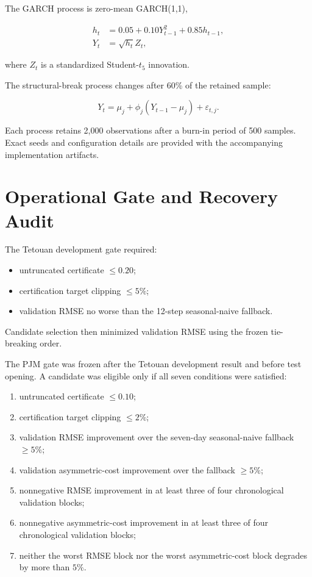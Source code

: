 \documentclass[12pt,draftclsnofoot,onecolumn]{IEEEtran}
\begin{document}
	The GARCH process is zero-mean GARCH(1,1),
	
	\begin{align}
		h_t&=0.05+0.10Y_{t-1}^{2}+0.85h_{t-1},
		\\
		Y_t&=\sqrt{h_t}Z_t ,
	\end{align}
	
	where $Z_t$ is a standardized Student-$t_5$ innovation.
	
	The structural-break process changes after 60\% of the retained sample:
	
	\begin{equation}
		Y_t=
		\mu_j+\phi_j(Y_{t-1}-\mu_j)+\varepsilon_{t,j}.
	\end{equation}
	
	Each process retains 2,000 observations after a burn-in period of 500 samples. Exact seeds and configuration details are provided with the accompanying implementation artifacts.
	
	
	\section{Operational Gate and Recovery Audit}
	\label{sup:operation}
	
	The Tetouan development gate required:
	
	\begin{itemize}
		\item untruncated certificate $\le0.20$;
		\item certification target clipping $\le5\%$;
		\item validation RMSE no worse than the 12-step seasonal-naive fallback.
	\end{itemize}
	
	Candidate selection then minimized validation RMSE using the frozen tie-breaking order.
	
	The PJM gate was frozen after the Tetouan development result and before test opening. A candidate was eligible only if all seven conditions were satisfied:

\begin{enumerate}
\item untruncated certificate $\le 0.10$;
\item certification target clipping $\le 2\%$;
\item validation RMSE improvement over the seven-day seasonal-naive fallback $\ge 5\%$;
\item validation asymmetric-cost improvement over the fallback $\ge 5\%$;
\item nonnegative RMSE improvement in at least three of four chronological validation blocks;
\item nonnegative asymmetric-cost improvement in at least three of four chronological validation blocks;
\item neither the worst RMSE block nor the worst asymmetric-cost block degrades by more than $5\%$.
\end{enumerate}
	
\end{document}
